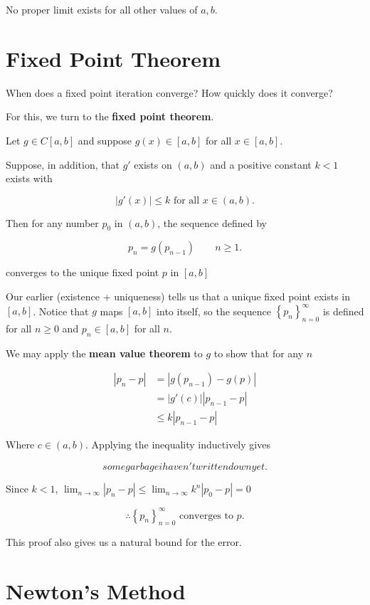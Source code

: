 No proper limit exists for all other values of $a, b$.

\section{Fixed Point Theorem}

When does a fixed point iteration converge? How quickly does it converge?

For this, we turn to the \textbf{fixed point theorem}.

\thm Let $g\in C[a,b]$ and suppose $g(x) \in [a, b]$ for all $x \in [a,b]$.

Suppose, in addition, that $g'$ exists on $(a,b)$ and a positive constant $k<1$
exists with 

\[
|g'(x)| \leq k \text{ for all } x \in (a,b)
.\]

Then for any number $p_0$ in $(a,b)$, the sequence defined by

\[
  p_n = g(p_{n-1}) \qquad n \geq 1
.\]

converges to the unique fixed point $p$ in $[a, b]$

\proof

Our earlier \thm (existence + uniqueness) tells us that a unique fixed point
exists in $[a,b]$. Notice that $g$ maps $[a, b]$ into itself, so the sequence 
$\displaystyle \left\{ p_n \right\}_{n=0}^\infty$ is defined for all $n \geq 0$
and $p_n \in [a, b]$ for all $n$.

We may apply the \textbf{mean value theorem} to $g$ to show that for any $n$

\begin{align*}
  |p_n-p| &= |g(p_{n-1}) - g(p)| \\
          &= |g'(c)||p_{n-1}-p| \\
          &\leq k|p_{n-1}-p|
\end{align*}

Where $c \in (a,b)$. Applying the inequality inductively gives 

\[
some garbage i haven't written down yet
.\]

Since $k<1$, $\displaystyle \lim_{n\to\infty} |p_n-p| \leq \lim_{n\to\infty} k^n|p_0-p| = 0$

\[
  \therefore \left\{ p_n \right\}_{n=0}^\infty \text{ converges to } p 
.\]

This proof also gives us a natural bound for the error. 

\section{Newton's Method}

